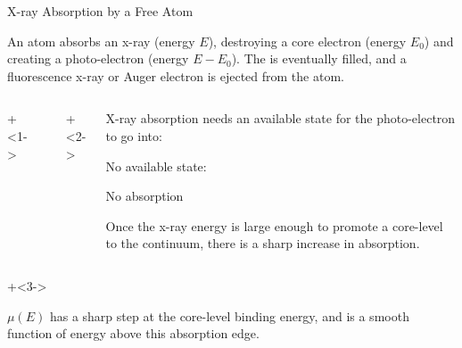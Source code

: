 \begin{slide}{X-ray Absorption by a Free Atom}

  \Justify An atom absorbs an x-ray (energy $E$), destroying a core electron (energy
  ${E_0}$) and creating a photo-electron (energy ${E-E_0}$).  The
  {} is eventually filled, and a fluorescence x-ray or Auger
  electron is ejected from the atom.

    \vspace{3mm}

    \begin{columns}[T]
        \onslide+<1->
        \begin{column}{62mm}
        \end{column}

        \onslide+<2->
        \begin{column}{44mm}    \setlength{\baselineskip}{10pt}
          \Justify

        X-ray absorption needs an available state for the
        photo-electron to go into:\par
        \vspace{1mm}

        \begin{center}
          \begin{postitbox}{28mm}
            No available state:\par No absorption
          \end{postitbox}
          \end{center}
      \vspace{1mm}

      Once the x-ray energy is large enough to promote a core-level to the
      continuum, there is a sharp increase in absorption.

      \end{column}
    \end{columns}

    \vspace{-2mm}

    {\onslide+<3->

    \begin{center}
      \begin{postitbox}{80mm}\Justify
        ${\mu(E)}$ has a sharp step at the core-level binding energy, and
        is a smooth function of energy above this absorption edge.
        \par
        \end{postitbox}
     \end{center}
     }

\vmm\vmm
\end{slide}
